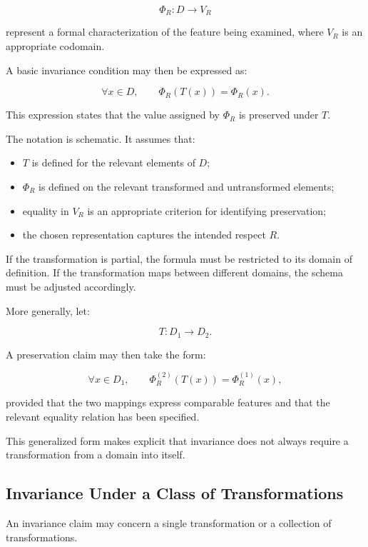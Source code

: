\[
    \Phi_R : D \rightarrow V_R
\]

represent a formal characterization of the feature
being examined, where \(V_R\) is an appropriate
codomain.

A basic invariance condition may then be expressed as:

\[
    \forall x \in D,\qquad
    \Phi_R(T(x)) = \Phi_R(x).
\]

This expression states that the value assigned by
\(\Phi_R\) is preserved under \(T\).

The notation is schematic. It assumes that:

\begin{itemize}
    \item \(T\) is defined for the relevant elements
    of \(D\);

    \item \(\Phi_R\) is defined on the relevant
    transformed and untransformed elements;

    \item equality in \(V_R\) is an appropriate
    criterion for identifying preservation;

    \item the chosen representation captures the
    intended respect \(R\).
\end{itemize}

If the transformation is partial, the formula must
be restricted to its domain of definition. If the
transformation maps between different domains,
the schema must be adjusted accordingly.

More generally, let:

\[
    T : D_1 \rightarrow D_2.
\]

A preservation claim may then take the form:

\[
    \forall x \in D_1,\qquad
    \Phi_R^{(2)}(T(x))
    =
    \Phi_R^{(1)}(x),
\]

provided that the two mappings express comparable
features and that the relevant equality relation
has been specified.

This generalized form makes explicit that invariance
does not always require a transformation from a
domain into itself.

\subsection{Invariance Under a Class of Transformations}

An invariance claim may concern a single
transformation or a collection of transformations.

